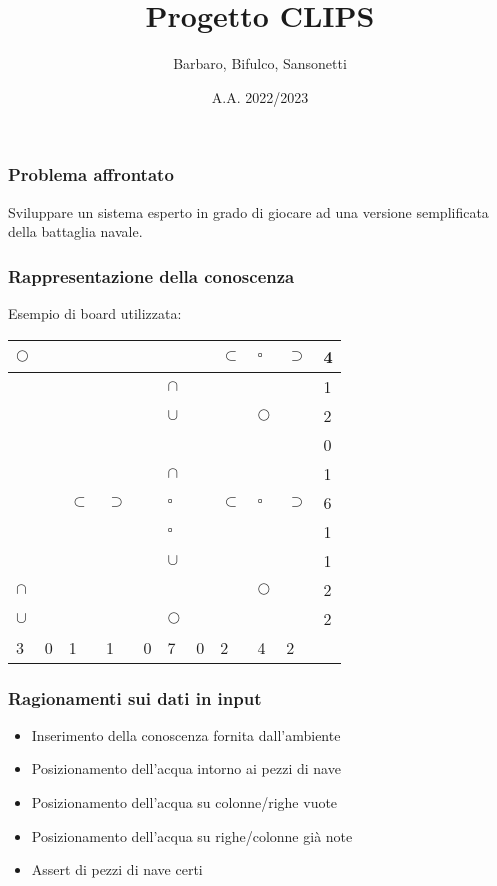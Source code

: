 \documentclass[11pt]{beamer}
\author{Barbaro, Bifulco, Sansonetti}
\title{Progetto CLIPS}
\date{A.A. 2022/2023}
\institute[]{Università degli studi di Torino\\Intelligenza Artificiale e Laboratorio}
\begin{document}
\begin{frame}
\titlepage
\end{frame}


\begin{frame}
    \frametitle{Problema affrontato}
    Sviluppare un sistema esperto in grado di giocare ad una versione semplificata della battaglia navale.
\end{frame}

\begin{frame}
    \frametitle{Rappresentazione della conoscenza}
    Esempio di board utilizzata:
    \begin{table}
        \begin{tabular}{|l|l|l|l|l|l|l|l|l|l||l|}
        \hline
         $\Circle$ &  &  &  &  &  &  & $\subset$ & $\square$ & $\supset$ & 4 \\ \hline
         &  &  &  &  & $\cap$ &  &  &  &  & 1 \\ \hline
         &  &  &  &  & $\cup$ &  &  & $\Circle$ &  & 2 \\ \hline
         &  &  &  &  &  &  &  &  &  & 0 \\ \hline
         &  &  &  &  & $\cap$ &  &  &  &  & 1 \\ \hline
         &  & $\subset$ & $\supset$ &  & $\square$ &  & $\subset$ & $\square$ & $\supset$ & 6 \\ \hline
         &  &  &  &  & $\square$ &  &  &  &  & 1 \\ \hline
         &  &  &  &  & $\cup$ &  &  &  &  & 1 \\ \hline
         $\cap$ &  &  &  &  &  &  &  & $\Circle$ &  & 2 \\ \hline
         $\cup$ &  &  &  &  & $\Circle$ &  &  &  &  & 2 \\ \hline \hline
         3 & 0 & 1 & 1 & 0 & 7 & 0 & 2 & 4 & 2 & \\ \hline
        \end{tabular}
    \end{table}
\end{frame}

\begin{frame}
    \frametitle{Ragionamenti sui dati in input}
    \begin{itemize}
        \item Inserimento della conoscenza fornita dall'ambiente
        \item Posizionamento dell'acqua intorno ai pezzi di nave
        \item Posizionamento dell'acqua su colonne/righe vuote
        \item Posizionamento dell'acqua su righe/colonne già note
        \item Assert di pezzi di nave certi
    \end{itemize}
\end{frame}
\end{document}

